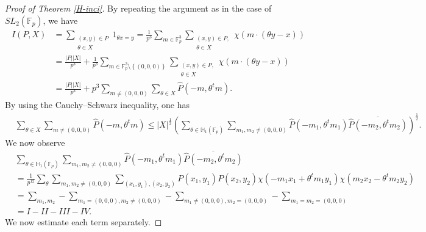 \documentclass[10pt,a4paper]{amsart}
\def\Fbb{\mathbb{F}}
\def\l({\left(}
\def\lo{\left\{}
\def\ro{\right\}}
\def\lv{\left\vert}
\def\r){\right)}
\def\rv{\right\vert}
\begin{document}
\begin{proof}[Proof of Theorem \ref{H-inci}]
By repeating the argument as in the case of $SL_2(\mathbb{F}_p)$, we have 
    \begin{align*}
        I(P,X) & = \sum_{\substack{(x,y )\in P \\ \theta \in X}} 1_{\theta x=y } =\frac{1}{p^3} \sum_{m\in \Fbb_p^3} \sum_{\substack{(x,y)\in P, \\ \theta \in X}} \chi \l( m\cdot \l( \theta y-x \r) \r) \\
        & = \frac{\lv P\rv \lv X\rv}{p^3} + \frac{1}{p^3} \sum_{ m\in \Fbb_p^3 \setminus \lo (0,0, 0)\ro } \sum_{\substack{ (x,y)\in P ,\\ \theta \in X }} \chi \l( m \cdot \l( \theta y -x \r) \r) \\
        & = \frac{\lv P\rv \lv X\rv}{p^3} + p^3\sum_{m\ne (0, 0, 0)} \sum_{\theta \in X} \widehat{P} \l( -m,\theta^t m\r).
    \end{align*}
By using the Cauchy--Schwarz inequality, one has 
\begin{align*}
    &\sum_{\theta\in X}\sum_{m\ne (0, 0, 0)}\widehat{P}(-m, \theta^tm)\le |X|^{\frac{1}{2}}\left(\sum_{\theta\in \mathbb{H}_1(\Fbb_p)}\sum_{m_1, m_2\ne (0, 0, 0)}\widehat{P}(-m_1, \theta^tm_1)\overline{\widehat{P}(-m_2, \theta^tm_2)}\right)^{\frac{1}{2}}.
\end{align*}
We now observe 
\begin{align*}
    &\sum_{\theta\in \mathbb{H}_1(\Fbb_p)}\sum_{m_1, m_2\ne (0, 0, 0)}\widehat{P}(-m_1, \theta^tm_1)\overline{\widehat{P}(-m_2, \theta^tm_2)}\\&=\frac{1}{p^{12}}\sum_{\theta}\sum_{m_1, m_2\ne (0, 0, 0)}\sum_{(x_1, y_1), (x_2, y_2)}P(x_1, y_1)P(x_2, y_2)\chi(-m_1x_1+\theta^tm_1y_1)\chi(m_2x_2-\theta^tm_2y_2)\\
    &=\sum_{m_1, m_2}-\sum_{m_1=(0, 0, 0), m_2\ne (0, 0, 0)}-\sum_{m_1\ne (0, 0, 0), m_2=(0, 0, 0)}-\sum_{m_1=m_2=(0, 0, 0)}\\
    &=I-II-III-IV.
\end{align*}
We now estimate each term separately. 


\end{proof}
\end{document}
